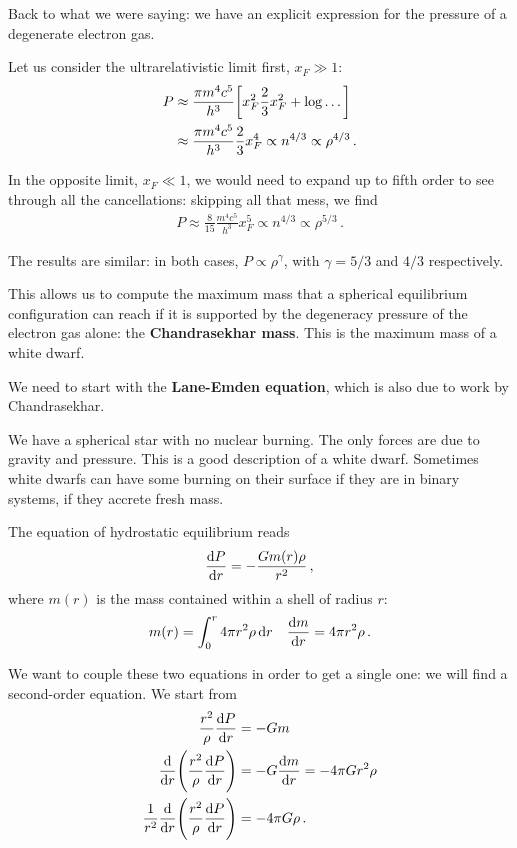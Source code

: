 \documentclass[main.tex]{subfiles}
\begin{document}

Back to what we were saying: we have an explicit expression for the pressure of a degenerate electron gas. 

Let us consider the ultrarelativistic limit first, \(x_F \gg 1\): 
%
\begin{align}
P &\approx \frac{\pi m^4 c^{5}}{h^3}
\qty[x_F^2 \frac{2}{3} x_F^2 + \log \dots]  \\
&\approx \frac{\pi m^4 c^{5}}{h^3} \frac{2}{3} x_F^{4} \propto n^{4/3} \propto \rho^{4/3}
\,.
\end{align}

In the opposite limit, \(x_F \ll 1\), we would need to expand up to fifth order to see through all the cancellations: skipping all that mess, we find
%
\begin{align}
P \approx \frac{8}{15} \frac{m^4 c^5}{h^3} x_F^{5} \propto n^{4/3}  \propto \rho^{5/3}
\,.
\end{align}

The results are similar: in both cases, \(P \propto \rho^{\gamma }\), with \(\gamma = 5/3\) and \(4/3\) respectively.

This allows us to compute the maximum mass that a spherical equilibrium configuration can reach if it is supported by the degeneracy pressure of the electron gas alone: the \textbf{Chandrasekhar mass}.
This is the maximum mass of a white dwarf. 

We need to start with the \textbf{Lane-Emden equation}, which is also due to work by Chandrasekhar. 

We have a spherical star with no nuclear burning. 
The only forces are due to gravity and pressure. This is a good description of a white dwarf. 
Sometimes white dwarfs can have some burning on their surface if they are in binary systems, if they accrete fresh mass. 

The equation of hydrostatic equilibrium reads 
%
\begin{align}
\dv{P}{r} = - \frac{G m(r) \rho }{r^2}
\,,
\end{align}
%
where \(m(r)\) is the mass contained within a shell of radius \(r\):
%
\begin{align}
m(r) = \int_0^{r} 4 \pi r^2 \rho \dd{r} 
&& 
\dv{m}{r} = 4 \pi r^2 \rho 
\,.
\end{align}

We want to couple these two equations in order to get a single one: we will find a second-order equation. 
We start from 
%
\begin{align}
\frac{r^2}{\rho }\dv{P}{r} &= - G m  \\
\dv{}{r} \qty(\frac{r^2}{\rho }\dv{P}{r}) &=
- G \dv{m}{r} = - 4 \pi G r^2 \rho  \\
\frac{1}{r^2} \dv{}{r} \qty( \frac{r^2}{\rho } \dv{P}{r}) &= - 4 \pi G \rho 
\,.
\end{align}
\end{document}
